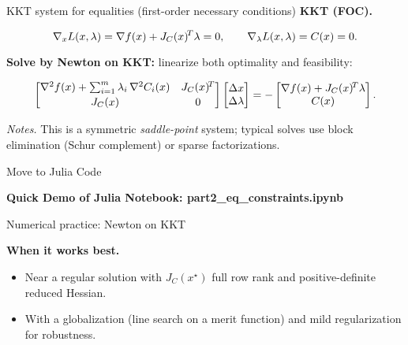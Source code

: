 \begin{frame}{KKT system for equalities (first-order necessary conditions)}
\textbf{KKT (FOC).}

$$
\nabla_x L(x,\lambda)=\nabla f(x)+J_C(x)^{\!T}\lambda=0,\qquad \nabla_\lambda L(x,\lambda)=C(x)=0.
$$

\textbf{Solve by Newton on KKT:} linearize both optimality and feasibility:

$$
\begin{bmatrix}
\nabla^2 f(x) + \sum_{i=1}^m \lambda_i\,\nabla^2 C_i(x) & J_C(x)^{\!T}\\[2pt]
J_C(x) & 0
\end{bmatrix}
\begin{bmatrix}\Delta x\\ \Delta\lambda\end{bmatrix}
=-
\begin{bmatrix}
\nabla f(x)+J_C(x)^{\!T}\lambda\\ C(x)
\end{bmatrix}.
$$

\textit{Notes.} This is a symmetric \emph{saddle-point} system; typical solves use block elimination (Schur complement) or sparse factorizations.
\end{frame}






\begin{frame}{Move to Julia Code}
\begin{center}
    \textbf{Quick Demo of Julia Notebook: part2\_eq\_constraints.ipynb}
\end{center}
\end{frame}

\begin{frame}{Numerical practice: Newton on KKT}

  
    \textbf{When it works best.}
    \begin{itemize}
      \item Near a regular solution with $J_{C}(x^\star)$ full row rank and positive-definite reduced Hessian.
      \item With a globalization (line search on a merit function) and mild regularization for robustness.
    \end{itemize}

\end{frame}


